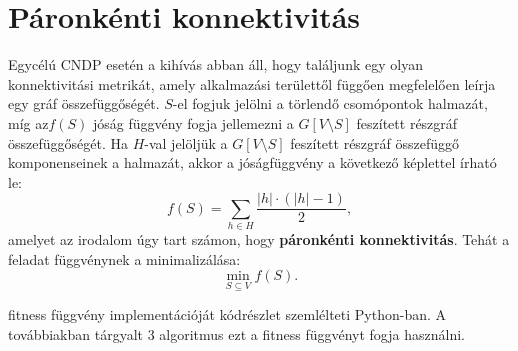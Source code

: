 \section{Páronkénti konnektivitás}\label{sec:PAIRWISE_CONNECTIVITY}

Egycélú CNDP esetén a kihívás abban áll, hogy találjunk egy olyan konnektivitási metrikát,
amely alkalmazási területtől függően megfelelően leírja egy gráf összefüggőségét.
$S$-el fogjuk jelölni a törlendő csomópontok halmazát,
míg az$f(S)$ jóság függvény fogja jellemezni a $G[V \setminus S]$ feszített részgráf összefüggőségét.
Ha $H$-val jelöljük a $G[V \setminus S]$ feszített részgráf összefüggő komponenseinek a halmazát,
akkor a jóságfüggvény a következő képlettel írható le:
\begin{equation}\label{eqn:PAIRWISE_CONNECTIVITY}
  f(S) = \sum_{h \in H} \frac{|h| \cdot (|h| - 1)}{2},
\end{equation}
amelyet az irodalom \cite{ventresca2012global, aringhieri2016general} úgy tart számon,
hogy \textbf{páronkénti konnektivitás}.
Tehát a feladat  függvénynek a minimalizálása:
\begin{equation}\label{eqn:MIN_PAIRWISE_CONNECTIVITY}
  \min_{S \subseteq V} f(S).
\end{equation}

 fitness függvény implementációját
 kódrészlet szemlélteti Python-ban.
A továbbiakban tárgyalt 3 algoritmus ezt a fitness függvényt fogja használni.

